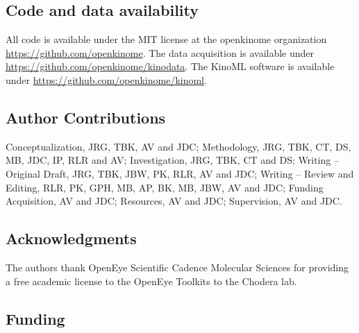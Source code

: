 \documentclass[9pt,lessons, pubversion]{livecoms}
\begin{document}


\subsection{Code and data availability}
All code is available under the MIT license at the openkinome organization \url{https://github.com/openkinome}. The data acquisition is available under \url{https://github.com/openkinome/kinodata}. The KinoML software is available under \url{https://github.com/openkinome/kinoml}.

\subsection{Author Contributions}
Conceptualization, JRG, TBK, AV and JDC; 
Methodology, JRG, TBK, CT, DS, MB, JDC, IP, RLR and AV; 
Investigation, JRG, TBK, CT and DS; 
Writing – Original Draft, JRG, TBK, JBW, PK, RLR, AV and JDC; 
Writing – Review and Editing, RLR, PK, GPH, MB, AP, BK, MB, JBW, AV and JDC; 
Funding Acquisition, AV and JDC; 
Resources, AV and JDC;
Supervision, AV and JDC.

\subsection{Acknowledgments}

The authors thank OpenEye Scientific Cadence Molecular Sciences for providing a free academic license to the OpenEye Toolkits to the Chodera lab.


\subsection{Funding}
\end{document}
